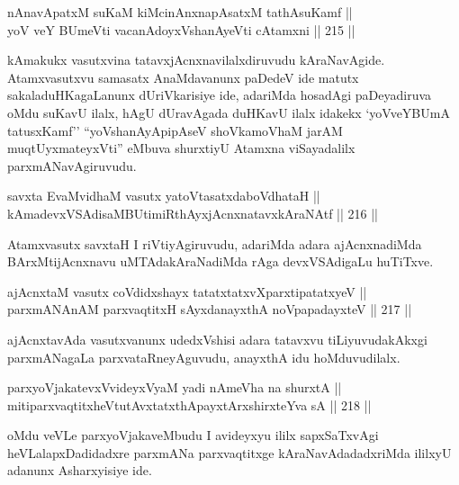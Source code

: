 \begin{shl}
nAnavApatxM suKaM kiMcinAnxnapAsatxM tathA\s suKamf || \\
yoV veY BUmeVti vacanAdoyxV\s shanAyeVti cA\s \s tamxni \hfill || 215 ||  
\end{shl}


\begin{artha}
kAmakukx vasutxvina tatavxjAcnxnavilalxdiruvudu
kAraNavAgide. Atamxvasutxvu samasatx AnaMdavanunx paDedeV ide matutx
sakaladuHKagaLanunx dUriVkarisiye ide, adariMda hosadAgi paDeyadiruva 
oMdu suKavU ilalx, hAgU dUravAgada duHKavU ilalx idakekx `yoVveYBUmA
tatusxKamf'' ``yoV\s shanAyApipAseV shoVkamoVhaM jarAM
muqtUyxmateyxVti'' eMbuva shurxtiyU Atamxna viSayadalilx
parxmANavAgiruvudu.
\end{artha}

\begin{shl}
savxta EvaMvidhaM vasutx yatoV\s tasatxdaboVdhataH || \\
kAmadevxVSAdisaMBUtimiRthAyxjAcnxnatavxkAraNAtf \hfill || 216 ||  
\end{shl}

\begin{artha}
Atamxvasutx savxtaH I riVtiyAgiruvudu, adariMda adara ajAcnxnadiMda
BArxMtijAcnxnavu uMTAdakAraNadiMda rAga devxVSAdigaLu huTiTxve.
\end{artha}

\begin{shl}
ajAcnxtaM vasutx coVdidxshayx tatatxtatxvXparxtipatatxyeV || \\
parxmANAnAM parxvaqtitxH sAyxdanayxthA noVpapadayxteV \hfill || 217 ||  
\end{shl}

\begin{artha}
ajAcnxtavAda vasutxvanunx udedxVshisi adara tatavxvu tiLiyuvudakAkxgi
parxmANagaLa parxvataRneyAguvudu, anayxthA idu hoMduvudilalx.
\end{artha}

\begin{shl}
parxyoVjakatevxV\s videyxVyaM yadi nAmeVha na shurxtA || \\
mitiparxvaqtitxheVtutAvxtatxthA\s payxtArx\s \s shirxteYva sA \hfill || 218 ||  
\end{shl}

\begin{artha}
oMdu veVLe parxyoVjakaveMbudu I avideyxyu ililx sapxSaTxvAgi
heVLalapxDadidadxre parxmANa parxvaqtitxge kAraNavAdadadxriMda ililxyU
adanunx Asharxyisiye ide.
\end{artha}

